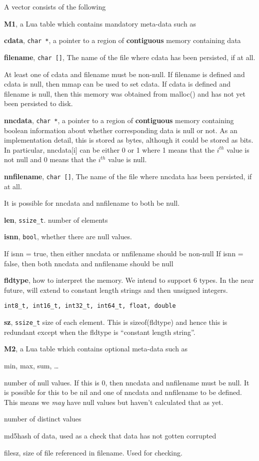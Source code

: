 A vector consists of the following
\be
\item {\bf M1}, a Lua table which contains mandatory meta-data such as 
\be
\item {\bf cdata}, \verb+char *+, a pointer to a region of {\bf contiguous} memory
containing data 
\item {\bf filename}, \verb+char []+, The name of the file where cdata has been
persisted, if at all. 

At least one of cdata and filename must be non-null.
If filename is defined and cdata is null, then mmap can be used to set cdata. If
cdata is defined and filename is null, then this memory was obtained from
malloc()
and has not yet been persisted to disk.
\item {\bf nncdata}, \verb+char *+, a pointer to a region of {\bf contiguous} memory
containing boolean information about whether corresponding data is null or not.
As an implementation detail, this is stored as bytes, although it could be
stored as bits. In particular, nncdata[i] can be either 0 or 1 where 
1 means that the \(i^{th}\) value is not null and 
0 means that the \(i^{th}\) value is null. 

\item {\bf nnfilename}, \verb+char []+, The name of the file where nncdata has been
persisted, if at all. 

It is possible for nncdata and nnfilename to both be null.
\item {\bf len}, \verb+ssize_t+. number of elements
\item {\bf isnn}, \verb+bool+, whether there are null values. 

If isnn = true, then either nncdata or nnfilename should be non-null
If isnn = false, then both nncdata and nnfilename should be null
\item {\bf fldtype}, how to interpret the memory. We intend to support 6 types.
In the near  future, will extend to constant length strings and then unsigned integers. 
\begin{verbatim}
int8_t, int16_t, int32_t, int64_t, float, double
\end{verbatim}

\item {\bf sz}, \verb+ssize_t+ size of each element. This is sizeof(fldtype) and
hence this is redundant except when the fldtype is ``constant length
string''.
\ee
\item {\bf M2}, a Lua table which contains optional meta-data such as 
\be
\item min, max, sum, \ldots
\item number of null values. If this is 0, then nncdata and nnfilename must be
null. It is possible for this to be nil and one of nncdata and nnfilename to be
defined. This means we {\em may} have null values but haven't calculated that as
yet. 
\item number of distinct values
\item md5hash of data, used as a check that data has not gotten corrupted
\item filesz, size of file referenced in filename. Used for checking.

